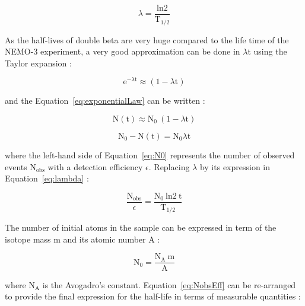 \documentclass[main.tex]{subfiles}
\begin{document}
\begin{equation}\label{eq:lambda}
\lambda = \frac{\text{ln2}}{\text{T}_{\text{1/2}}}
\end{equation}


\bigskip


\NI As the half-lives of double beta are very huge compared to the life time of the NEMO-3 experiment, a very good approximation can be done in $\lambda$t using the Taylor expansion :  


\begin{equation}
\text{e}^{-\lambda \text{t}} \approx (\text{1}-\lambda \text{t})
\end{equation}


\bigskip


\NI and the Equation~\ref{eq:exponentialLaw} can be written :


\begin{equation}
\text{N}(\text{t}) \approx \text{N}_\text{0}~(\text{1} - \lambda \text{t})
\end{equation}

\begin{equation}\label{eq:N0}
\text{N}_\text{0} - \text{N} (\text{t}) = \text{N}_\text{0} \lambda \text{t}
\end{equation}


\bigskip


\NI where the left-hand side of Equation~\ref{eq:N0} represents the number of observed events N$_{\text{obs}}$ with a detection efficiency $\epsilon$. Replacing $\lambda$ by its expression in Equation~\ref{eq:lambda} : 

\begin{equation}\label{eq:NobsEff}
\frac{\text{N}_{\text{obs}}}{\epsilon} = \frac{\text{N}_\text{0}~\text{ln2}~\text{t}}{\text{T}_{\text{1/2}}}
\end{equation}


\bigskip


\NI The number of initial atoms in the sample can be expressed in term of the isotope mass m and its atomic number A : 


\begin{equation}
\text{N}_\text{0} = \frac{\text{N}_\text{A}~\text{m}}{\text{A}}
\end{equation}


\bigskip


\NI where $\text{N}_\text{A}$ is the Avogadro's constant. Equation~\ref{eq:NobsEff} can be re-arranged to provide the final expression for the half-life in terms of measurable quantities : 
\end{document}
